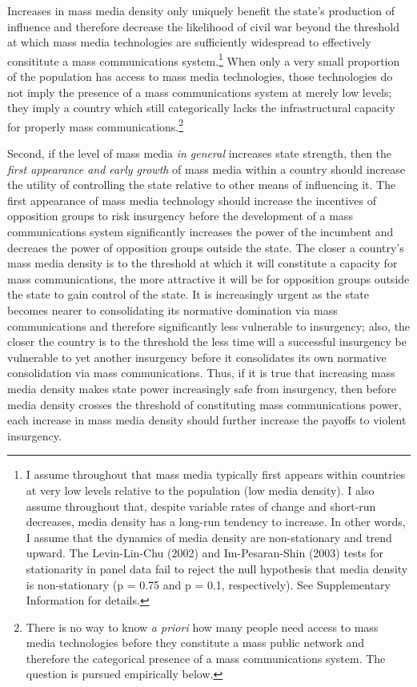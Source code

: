 \documentclass[11pt,article,oneside]{memoir}
\begin{document}
Increases in mass media density only uniquely benefit the state's
production of influence and therefore decrease the likelihood of civil
war beyond the threshold at which mass media technologies are
sufficiently widespread to effectively consititute a mass communications
system.\footnote{I assume throughout that mass media typically first
  appears within countries at very low levels relative to the population
  (low media density). I also assume throughout that, despite variable
  rates of change and short-run decreases, media density has a long-run
  tendency to increase. In other words, I assume that the dynamics of
  media density are non-stationary and trend upward. The Levin-Lin-Chu
  (2002) and Im-Pesaran-Shin (2003) tests for stationarity in panel data
  fail to reject the null hypothesis that media density is
  non-stationary (p = 0.75 and p = 0.1, respectively). See Supplementary
  Information for details.} When only a very small proportion of the
population has access to mass media technologies, those technologies do
not imply the presence of a mass communications system at merely low
levels; they imply a country which still categorically lacks the
infrastructural capacity for properly mass communications.\footnote{There
  is no way to know \emph{a priori} how many people need access to mass
  media technologies before they constitute a mass public network and
  therefore the categorical presence of a mass communications system.
  The question is pursued empirically below.}

Second, if the level of mass media \emph{in general} increases state
strength, then the \emph{first appearance and early growth} of mass
media within a country should increase the utility of controlling the
state relative to other means of influencing it. The first appearance of
mass media technology should increase the incentives of opposition
groups to risk insurgency before the development of a mass
communications system significantly increases the power of the incumbent
and decreaes the power of opposition groups outside the state. The
closer a country's mass media density is to the threshold at which it
will constitute a capacity for mass communications, the more attractive
it will be for opposition groups outside the state to gain control of
the state. It is increasingly urgent as the state becomes nearer to
consolidating its normative domination via mass communications and
therefore significantly less vulnerable to insurgency; also, the closer
the country is to the threshold the less time will a successful
insurgency be vulnerable to yet another insurgency before it
consolidates its own normative consolidation via mass communications.
Thus, if it is true that increasing mass media density makes state power
increasingly safe from insurgency, then before media density crosses the
threshold of constituting mass communications power, each increase in
mass media density should further increase the payoffs to violent
insurgency.
\end{document}
